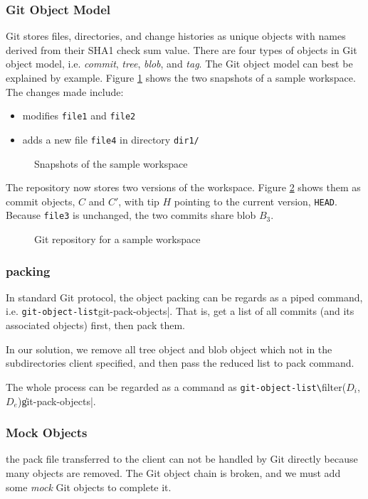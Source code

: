 \documentclass[preprint]{sigplanconf}
\begin{document}
\subsubsection{Git Object Model}
Git stores files, directories, and change histories as unique objects with names derived from their SHA1 check sum value\cite{gitobj}.
There are four types of objects in Git object model, i.e. \emph{commit}, \emph{tree}, \emph{blob}, and \emph{tag}.
The Git object model can best be explained by example.
Figure \ref{fig:workspace} shows the two snapshots of a sample workspace.
The changes made include:
\begin{itemize}
  \item modifies \verb|file1| and \verb|file2|
  \item adds a new file \verb|file4| in directory \verb|dir1/|
\end{itemize}
\begin{figure}
  \centering
  
  \caption{Snapshots of the sample workspace}
  \label{fig:workspace}
\end{figure}

The repository now stores two versions of the workspace.
Figure \ref{fig:git-repo} shows them as commit objects, $C$ and $C'$, with tip $H$ pointing to the current version, \verb|HEAD|.
Because \verb|file3| is unchanged, the two commits share blob $B_3$.

\begin{figure}[htpb]
  \centering
  
  \caption{Git repository for a sample workspace}
  \label{fig:git-repo}
\end{figure}

\subsubsection{packing}
In standard Git protocol, the object packing can be regards as a piped command, i.e. \verb|git-object-list|git-pack-objects|.
That is, get a list of all commits (and its associated objects) first, then pack them.

In our solution, we remove all tree object and blob object which not in the subdirectories client specified, and then pass the reduced list to pack command.

The whole process can be regarded as a command as \verb|git-object-list\|filter($D_i$, $D_e$)\|git-pack-objects|.

\subsubsection{Mock Objects}
the pack file transferred to the client can not be handled by Git directly because many objects are removed.
The Git object chain is broken, and we must add some \emph{mock} Git objects to complete it.
\end{document}
